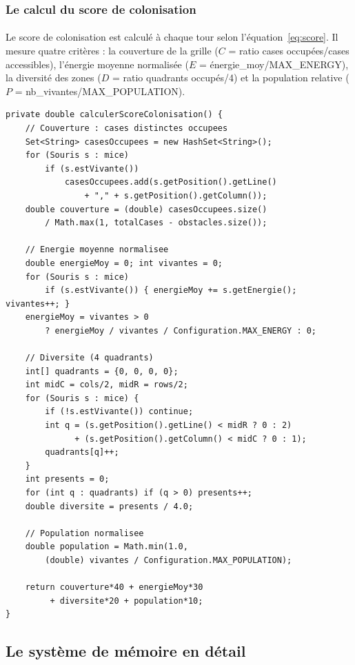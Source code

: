 \subsubsection{Le calcul du score de colonisation}

\paragraph{} Le score de colonisation est calculé à chaque tour selon l'équation~\ref{eq:score}. Il mesure quatre critères : la couverture de la grille ($C$ = ratio cases occupées/cases accessibles), l'énergie moyenne normalisée ($E$ = énergie\_moy/MAX\_ENERGY), la diversité des zones ($D$ = ratio quadrants occupés/4) et la population relative ($P$ = nb\_vivantes/MAX\_POPULATION).

\begin{lstlisting}[caption={Calcul du score de colonisation}]
private double calculerScoreColonisation() {
    // Couverture : cases distinctes occupees
    Set<String> casesOccupees = new HashSet<String>();
    for (Souris s : mice)
        if (s.estVivante())
            casesOccupees.add(s.getPosition().getLine()
                + "," + s.getPosition().getColumn());
    double couverture = (double) casesOccupees.size()
        / Math.max(1, totalCases - obstacles.size());

    // Energie moyenne normalisee
    double energieMoy = 0; int vivantes = 0;
    for (Souris s : mice)
        if (s.estVivante()) { energieMoy += s.getEnergie(); vivantes++; }
    energieMoy = vivantes > 0
        ? energieMoy / vivantes / Configuration.MAX_ENERGY : 0;

    // Diversite (4 quadrants)
    int[] quadrants = {0, 0, 0, 0};
    int midC = cols/2, midR = rows/2;
    for (Souris s : mice) {
        if (!s.estVivante()) continue;
        int q = (s.getPosition().getLine() < midR ? 0 : 2)
              + (s.getPosition().getColumn() < midC ? 0 : 1);
        quadrants[q]++;
    }
    int presents = 0;
    for (int q : quadrants) if (q > 0) presents++;
    double diversite = presents / 4.0;

    // Population normalisee
    double population = Math.min(1.0,
        (double) vivantes / Configuration.MAX_POPULATION);

    return couverture*40 + energieMoy*30
         + diversite*20 + population*10;
}
\end{lstlisting}

\bigskip

\subsection{Le système de mémoire en détail}

